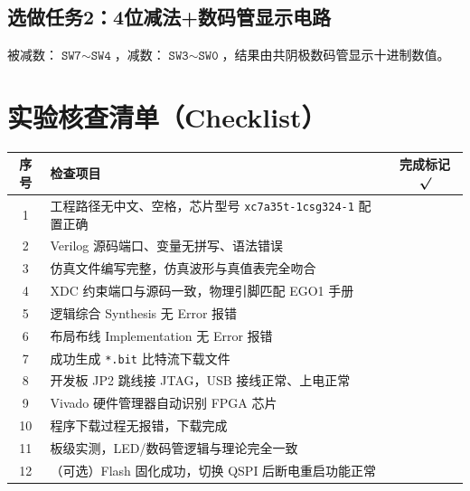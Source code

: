 \documentclass[11pt,a4paper]{article}
\begin{document}
\subsection{选做任务2：4位减法+数码管显示电路}
被减数：$\texttt{SW7}\sim\texttt{SW4}$，减数：$\texttt{SW3}\sim\texttt{SW0}$，结果由共阴极数码管显示十进制数值。

\section{实验核查清单（Checklist）}
\begin{table}[htbp]
\centering
\begin{tabular}{|c|l|c|}
\hline
序号 & 检查项目 & 完成标记 $\boldsymbol{\surd}$ \\
\hline
1 & 工程路径无中文、空格，芯片型号 \verb|xc7a35t-1csg324-1| 配置正确 & \\
\hline
2 & Verilog 源码端口、变量无拼写、语法错误 & \\
\hline
3 & 仿真文件编写完整，仿真波形与真值表完全吻合 & \\
\hline
4 & XDC 约束端口与源码一致，物理引脚匹配 EGO1 手册 & \\
\hline
5 & 逻辑综合 Synthesis 无 Error 报错 & \\
\hline
6 & 布局布线 Implementation 无 Error 报错 & \\
\hline
7 & 成功生成 \texttt{*.bit} 比特流下载文件 & \\
\hline
8 & 开发板 JP2 跳线接 JTAG，USB 接线正常、上电正常 & \\
\hline
9 & Vivado 硬件管理器自动识别 FPGA 芯片 & \\
\hline
10 & 程序下载过程无报错，下载完成 & \\
\hline
11 & 板级实测，LED/数码管逻辑与理论完全一致 & \\
\hline
12 & （可选）Flash 固化成功，切换 QSPI 后断电重启功能正常 & \\
\hline
\end{tabular}
\end{table}
\end{document}
